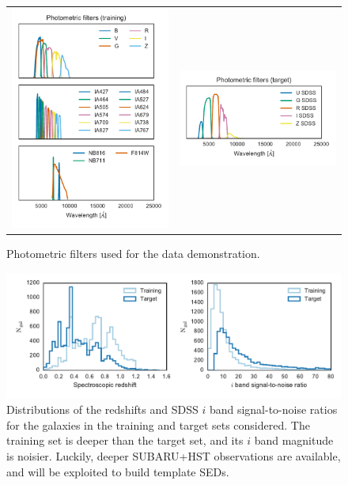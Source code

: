 \documentclass[aps,prd,showpacs,superscriptaddress,groupedaddress]{revtex4}  %
\begin{document}
\begin{figure}
\centering\begin{tabular}{cc}
\begin{minipage}{8cm}\includegraphics[width=8cm]{filters_training.pdf}\end{minipage}&
\begin{minipage}{8cm}\includegraphics[width=8cm]{filters_target.pdf}\end{minipage}
\end{tabular}
\caption{Photometric filters used for the data demonstration.}
\label{fig:filters}
\end{figure}

\begin{figure}
\centering
\includegraphics[width=16cm]{training_vs_target.pdf}
\caption{Distributions of the redshifts and SDSS $i$ band signal-to-noise ratios for the galaxies in the training and target sets considered. The training set is deeper than the target set, and its $i$ band magnitude is noisier. Luckily, deeper SUBARU+HST observations are available, and will be exploited to build template SEDs.}
\label{fig:training_vs_target}
\end{figure}
\end{document}
